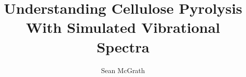 \title{Understanding Cellulose Pyrolysis With Simulated Vibrational Spectra}
\author{Sean McGrath}



